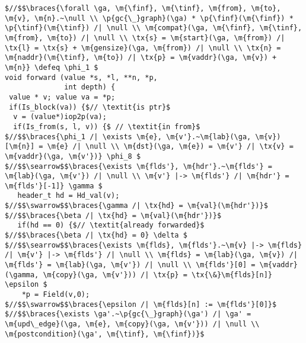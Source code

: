 \newcommand{\finf}{finf}
\newcommand{\tinf}{tinf}
\newcommand{\out}{out}
\newcommand{\braces}[1]{\left\{\!\!\!\begin{array}{l@{}} #1 \end{array}\right\}}
\newcommand{\ga}{\gamma}
\newcommand{\Eg}{E_\ga}
\newcommand{\Vg}{V_\ga}

\begin{figure*}[!ht]
\vspace{-1ex}
  \begin{lstlisting}[multicols=2]
$//$$\braces{\forall \ga, \m{\finf}, \m{\tinf}, \m{from}, \m{to}, \m{v}, \m{n}.~\null \\ \p{gc{\_}graph}(\ga) * \p{\finf}(\m{\finf}) * \p{\tinf}(\m{\tinf}) /| \null \\ \m{compat}(\ga, \m{\finf}, \m{\tinf}, \m{from}, \m{to}) /| \null \\ \tx{s} = \m{start}(\ga, \m{from}) /| \tx{l} = \tx{s} + \m{gensize}(\ga, \m{from}) /| \null \\ \tx{n} = \m{naddr}(\m{\tinf}, \m{to}) /| \tx{p} = \m{vaddr}(\ga, \m{v}) + \m{n}} \defeq \phi_1 $
void forward (value *s, *l, **n, *p, 
              int depth) {
 value * v; value va = *p; 
 if(Is_block(va)) {$// \textit{is ptr}$
  v = (value*)iop2p(va); 
  if(Is_from(s, l, v)) {$ // \textit{in from}$
$//$$\braces{\phi_1 /| \exists \m{e}, \m{v'}.~\m{lab}(\ga, \m{v})[\m{n}] = \m{e} /| \null \\ \m{dst}(\ga, \m{e}) = \m{v'} /| \tx{v} = \m{vaddr}(\ga, \m{v'})} \phi_8 $
$//$$\searrow$$\braces{\exists \m{flds'}, \m{hdr'}.~\m{flds'} = \m{lab}(\ga, \m{v'}) /| \null \\ \m{v'} |-> \m{flds'} /| \m{hdr'} = \m{flds'}[-1]} \gamma $
   header_t hd = Hd_val(v);
$//$$\swarrow$$\braces{\gamma /| \tx{hd} = \m{val}(\m{hdr'})}$
$//$$\braces{\beta /| \tx{hd} = \m{val}(\m{hdr'})}$ 
   if(hd == 0) {$// \textit{already forwarded}$
$//$$\braces{\beta /| \tx{hd} = 0} \delta $ 
$//$$\searrow$$\braces{\exists \m{flds}, \m{flds'}.~\m{v} |-> \m{flds} /| \m{v'} |-> \m{flds'} /| \null \\ \m{flds} = \m{lab}(\ga, \m{v}) /| \m{flds'} = \m{lab}(\ga, \m{v'}) /| \null \\ \m{flds'}[0] = \m{vaddr}(\gamma, \m{copy}(\ga, \m{v'})) /| \tx{p} = \tx{\&}\m{flds}[n]} \epsilon $
    *p = Field(v,0);
$//$$\swarrow$$\braces{\epsilon /| \m{flds}[n] := \m{flds'}[0]}$
$//$$\braces{\exists \ga'.~\p{gc{\_}graph}(\ga') /| \ga' = \m{upd\_edge}(\ga, \m{e}, \m{copy}(\ga, \m{v'})) /| \null \\ \m{postcondition}(\ga', \m{\tinf}, \m{\finf})}$

\end{lstlisting}
\end{figure*}
